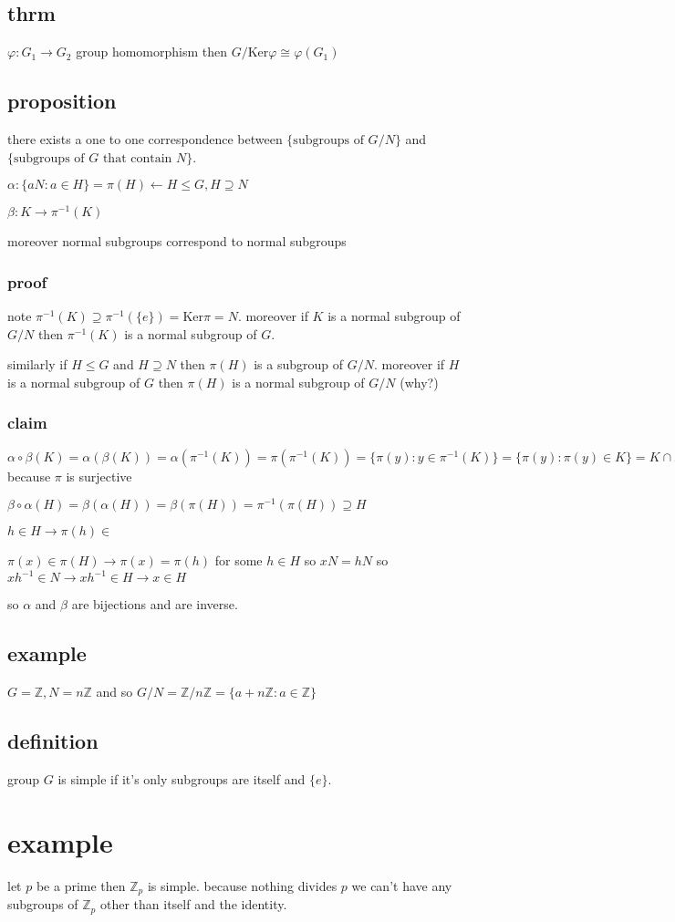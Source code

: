 \documentclass[letterpaper]{article}
\begin{document}
\subsection*{thrm}
$\varphi:G_1\to G_2$ group homomorphism then $G/\text{Ker}\varphi\cong\varphi(G_1)$
\subsection*{proposition}
there exists a one to one correspondence between $\{\text{subgroups of }G/N\}$ and $\{\text{subgroups of $G$ that contain $N$}\}$.

$\alpha:\{aN:a\in H\}=\pi(H)\leftarrow H\le G, H\supseteq N$

$\beta:K\to\pi^{-1}(K)$

moreover normal subgroups correspond to normal subgroups

\subsubsection*{proof}
note $\pi^{-1}(K)\supseteq\pi^{-1}(\{e\})=\text{Ker}\pi=N$. moreover if $K$ is a normal subgroup of $G/N$ then $\pi^{-1}(K)$ is a normal subgroup of $G$.

similarly if $H\le G$ and $H\supseteq N$ then $\pi(H)$ is a subgroup of $G/N$. moreover if $H$ is a normal subgroup of $G$ then $\pi(H)$ is a normal subgroup of $G/N$ (why?)

\subsubsection*{claim}
$\alpha\circ\beta(K)=\alpha(\beta(K))=\alpha(\pi^{-1}(K))=\pi(\pi^{-1}(K))=\{\pi(y):y\in \pi^{-1}(K)\}=\{\pi(y):\pi(y)\in K\}=K\cap I_m\pi=K\cap\pi(G)=K$ because $\pi$ is surjective

$\beta\circ\alpha(H)=\beta(\alpha(H))=\beta(\pi(H))=\pi^{-1}(\pi(H))\supseteq H$

$h\in H\to \pi(h)\in$

$\pi(x)\in  \pi(H)\to \pi(x)=\pi(h)$ for some $h\in H$ so $xN=hN$ so $xh^{-1}\in N\to xh^{-1}\in H\to x\in H$

so $\alpha$ and $\beta$ are bijections and are inverse.

\subsection*{example}
$G=\mathbb{Z}, N=n\mathbb{Z}$ and so $G/N=\mathbb{Z}/n\mathbb{Z}=\{a+n\mathbb{Z}:a\in \mathbb{Z}\}$

\subsection*{definition}
group $G$ is simple if it's only subgroups are itself and $\{e\}$. 

\section*{example}
let $p$ be a prime then $\mathbb{Z}_p$ is simple. because nothing divides $p$ we can't have any subgroups of $\mathbb{Z}_p$ other than itself and the identity.
\end{document}
